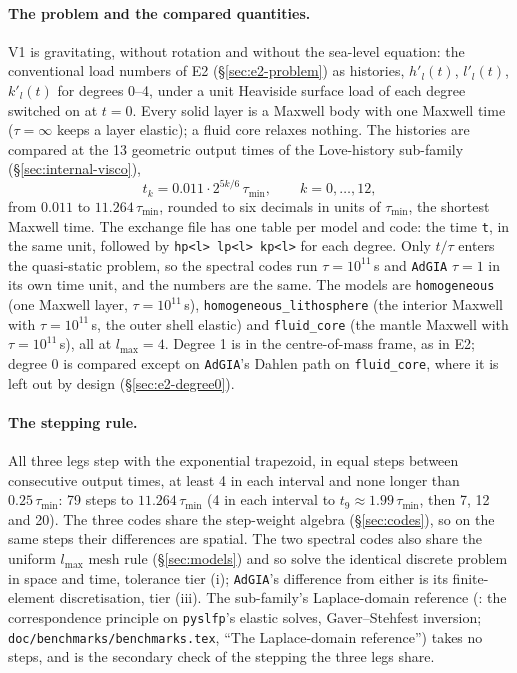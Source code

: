 \documentclass[11pt]{article}
\numberwithin{equation}{section}
\newcommand{\code}[1]{\texttt{#1}}
\begin{document}
\paragraph{The problem and the compared quantities.} V1 is gravitating, without rotation and without the
sea-level equation:
the conventional load numbers of E2 (\S\ref{sec:e2-problem}) as histories,
$h'_l(t)$, $l'_l(t)$, $k'_l(t)$ for degrees 0--4, under a unit Heaviside
surface load of each degree switched on at $t=0$. Every solid layer is a
Maxwell body with one Maxwell time ($\tau=\infty$ keeps a layer elastic); a
fluid core relaxes nothing. The histories are compared at the 13 geometric
output times of the Love-history sub-family (\S\ref{sec:internal-visco}),
\begin{equation}
  t_k = 0.011\cdot2^{5k/6}\,\tau_{\min},\qquad k=0,\dots,12,
  \label{eq:v1-times}
\end{equation}
from $0.011$ to $11.264\,\tau_{\min}$, rounded to six decimals in units of
$\tau_{\min}$, the shortest Maxwell time. The exchange file has one table
per model and code: the time \code{t}, in the same unit, followed by
\code{hp<l> lp<l> kp<l>} for each degree. Only $t/\tau$ enters the
quasi-static problem, so the spectral codes run $\tau=10^{11}$\,s and
\code{AdGIA} $\tau=1$ in its own time unit, and the numbers are the same.
The models are \code{homogeneous} (one Maxwell layer, $\tau=10^{11}$\,s),
\code{homogeneous\_lithosphere} (the interior Maxwell with
$\tau=10^{11}$\,s, the outer shell elastic) and \code{fluid\_core} (the
mantle Maxwell with $\tau=10^{11}$\,s), all at $l_{\max}=4$. Degree 1 is in
the centre-of-mass frame, as in E2; degree 0 is compared except on
\code{AdGIA}'s Dahlen path on \code{fluid\_core}, where it is left out by
design (\S\ref{sec:e2-degree0}).

\paragraph{The stepping rule.} All three legs step with the exponential
trapezoid, in equal steps between consecutive output times, at least 4 in
each interval and none longer than $0.25\,\tau_{\min}$: 79 steps to
$11.264\,\tau_{\min}$ (4 in each interval to $t_9\approx1.99\,\tau_{\min}$,
then 7, 12 and 20). The three codes share the step-weight algebra
(\S\ref{sec:codes}), so on the same steps their differences are spatial.
The two spectral codes also share the uniform $l_{\max}$ mesh rule
(\S\ref{sec:models}) and so solve the identical discrete problem in space
and time, tolerance tier (i); \code{AdGIA}'s difference from either is its
finite-element discretisation, tier (iii). The sub-family's Laplace-domain
reference (: the correspondence principle on
\code{pyslfp}'s elastic solves, Gaver--Stehfest inversion;
\code{doc/benchmarks/benchmarks.tex}, ``The Laplace-domain reference'') takes no
steps, and is the secondary check of the stepping the three legs share.
\end{document}
